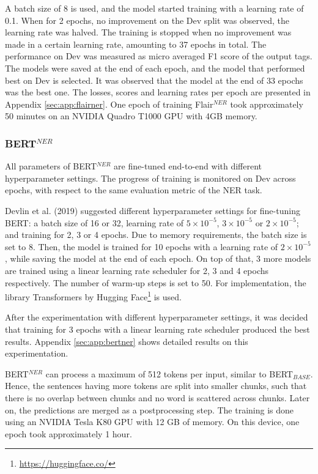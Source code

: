 \documentclass{report}
\theoremstyle{definition}
\theoremstyle{remark}
\begin{document}
A batch size of 8 is used, and the model started training with a learning rate of 0.1. When for 2 epochs, no improvement on the Dev split was observed, the learning rate was halved. The training is stopped when no improvement was made in a certain learning rate, amounting to 37 epochs in total. The performance on Dev was measured as micro averaged F1 score of the output tags. The models were saved at the end of each epoch, and the model that performed best on Dev is selected. It was observed that the model at the end of 33 epochs was the best one. The losses, scores and learning rates per epoch are presented in Appendix \ref{sec:app:flairner}. One epoch of training Flair$^{NER}$ took approximately 50 minutes on an NVIDIA Quadro T1000 GPU with 4GB memory. 
\subsubsection{BERT$^{NER}$}
All parameters of BERT$^{NER}$ are fine-tuned end-to-end with different hyperparameter settings. The progress of training is monitored on Dev across epochs, with respect to the same evaluation metric of the NER task.

Devlin et al. (2019) \cite{BERT} suggested different hyperparameter settings for fine-tuning BERT: a batch size of 16 or 32, learning rate of $5\times10^{-5}$, $3\times10^{-5}$ or $2\times10^{-5}$; and training for 2, 3 or 4 epochs. Due to memory requirements, the batch size is set to 8. Then, the model is trained for 10 epochs with a learning rate of $2\times10^{-5}$, while saving the model at the end of each epoch. On top of that, 3 more models are trained using a linear learning rate scheduler for 2, 3 and 4 epochs respectively. The number of warm-up steps is set to 50. For implementation, the library Transformers \cite{huggingface} by Hugging Face\footnote{\url{https://huggingface.co/}} is used.

After the experimentation with different hyperparameter settings, it was decided that training for 3 epochs with a linear learning rate scheduler produced the best results. Appendix \ref{sec:app:bertner} shows detailed results on this experimentation.

BERT$^{NER}$ can process a maximum of 512 tokens per input, similar to BERT$_{BASE}$. Hence, the sentences having more tokens are split into smaller chunks, such that there is no overlap between chunks and no word is scattered across chunks. Later on, the predictions are merged as a postprocessing step. The training is done using an NVIDIA Tesla K80 GPU with 12 GB of memory. On this device, one epoch took approximately 1 hour. 
\end{document}
